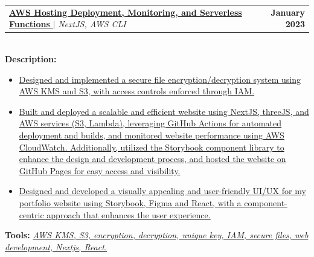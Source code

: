 \documentclass[letterpaper,11pt]{article}
\makeatletter
\newcommand{\resumeItem}[1]{
  \item\small{
    {#1 \vspace{-2pt}}
  }
}
\newcommand{\resumeProjectHeading}[2]{
    \item
    \begin{tabular*}{1.001\textwidth}{l@{\extracolsep{\fill}}r}
      \small#1 & \textbf{\small #2}\\
    \end{tabular*}\vspace{-7pt}
}
\newcommand{\resumeItemListStart}{\begin{itemize}}
\newcommand{\resumeItemListEnd}{\end{itemize}\vspace{-5pt}}
\makeatother
\begin{document}
                
                            
          
          \resumeProjectHeading
          {\href{https://yakkshit.com}{\textbf{AWS Hosting Deployment, Monitoring, and Serverless Functions }} $|$ \emph{NextJS, AWS CLI} \faGithub}{January 2023}\\
          \vspace{6pt}
          \textbf{Description:} 
          \vspace{-5pt}
          \resumeItemListStart
            \resumeItem{\href{https://yakkshit.com}{Designed and implemented a secure file encryption/decryption system using AWS KMS and S3, with access controls enforced through IAM.}}
            \resumeItem{\href{https://yakkshit.com}{Built and deployed a scalable and efficient website using NextJS, threeJS, and AWS services (S3, Lambda), leveraging GitHub Actions for automated deployment and builds, and monitored website performance using AWS CloudWatch. Additionally, utilized the Storybook component library to enhance the design and development process, and hosted the website on GitHub Pages for easy access and visibility.}}
            \resumeItem{\href{https://yakkshit.com}{Designed and developed a visually appealing and user-friendly UI/UX for my portfolio website using Storybook, Figma and React, with a component-centric approach that enhances the user experience.}}
          \resumeItemListEnd
          \vspace{-2pt}
          \textbf{Tools:}\emph{ \href{https://yakkshit.com}{AWS KMS, S3, encryption, decryption, unique key, IAM, secure files, web development, Nextjs, React.}}

          \vspace{-18pt}




                
\end{document}

